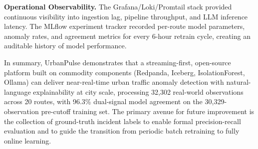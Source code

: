 \textbf{Operational Observability.}
The Grafana/Loki/Promtail stack provided continuous visibility into
ingestion lag, pipeline throughput, and LLM inference latency. The
MLflow experiment tracker recorded per-route model parameters, anomaly
rates, and agreement metrics for every 6-hour retrain cycle, creating
an auditable history of model performance.

\vspace{0.5cm}
\noindent In summary, UrbanPulse demonstrates that a streaming-first, open-source
platform built on commodity components (Redpanda, Iceberg, IsolationForest,
Ollama) can deliver near-real-time urban traffic anomaly detection with
natural-language explainability at city scale, processing 32,302 real-world
observations across 20 routes, with 96.3\% dual-signal model agreement on
the 30,329-observation pre-cutoff training set. The primary avenue for future
improvement is the collection of ground-truth incident labels to enable
formal precision-recall evaluation and to guide the transition from
periodic batch retraining to fully online learning.
